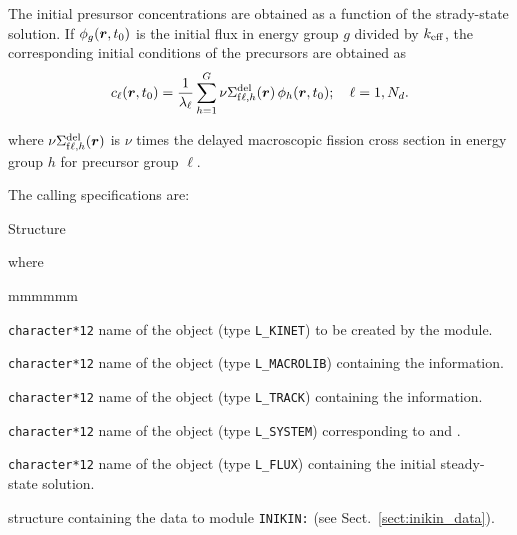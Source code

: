 The initial presursor concentrations are obtained as a function of the strady-state solution. If $\phi_g(\bff(r),t_0)$ is
the initial flux in energy group $g$ divided by $k_{\rm eff}$, the corresponding initial conditions of the precursors are obtained as
\begin{equation}
c_{\ell}(\bff(r),t_0)={1 \over \lambda_\ell} \sum_{h=1}^G \nu\Sigma_{{\rm f}\ell,h}^{\rm del}(\bff(r)) \, \phi_h(\bff(r),t_0) ; \ \ \ \ell=1,N_d .
\label{eq:eq_inikin_1}
\end{equation}

\noindent where $\nu\Sigma_{{\rm f}\ell,h}^{\rm del}(\bff(r))$ is $\nu$ times the delayed macroscopic fission cross section in energy group
$h$ for precursor group $\ell$.

The calling specifications are:

\begin{DataStructure}{Structure }
 \moc{:=}      \moc{::} 
\end{DataStructure}

\noindent where
\begin{ListeDeDescription}{mmmmmm}

\item[\dusa{KINET}] {\tt character*12} name of the  object (type {\tt L\_KINET}) to be created by the module.

\item[\dusa{MACRO}] {\tt character*12} name of the  object (type {\tt L\_MACROLIB}) containing the  information.

\item[\dusa{TRACK}] {\tt character*12} name of the  object (type {\tt L\_TRACK}) containing the  information.

\item[\dusa{SYST}] {\tt character*12} name of the  object (type {\tt L\_SYSTEM}) corresponding to  
and  .

\item[\dusa{FLUX}] {\tt character*12} name of the  object (type {\tt L\_FLUX}) containing the initial steady-state solution.

\item[\dstr{inikin\_data}] structure containing the data to module {\tt INIKIN:} (see Sect.~\ref{sect:inikin_data}).

\end{ListeDeDescription}

